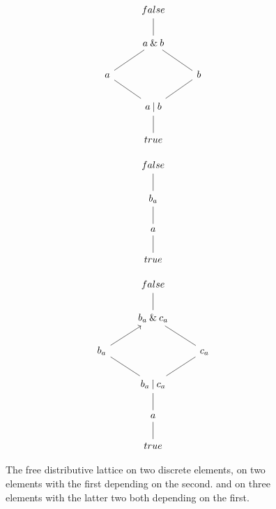 \documentclass[hoptionsi,review,format=acmsmall]{acmart}
\theoremstyle{definition}
\newcommand{\band}{\mathbin{\&}}
\newcommand{\bor}{\mathbin{|}}
\begin{document}
\begin{figure}
\begin{minipage}[c]{0.3\textwidth}
\begin{equation*}
\begin{tikzcd}
             & false                            &              \\
             & a \band b \arrow[u, no head]              &              \\
a \arrow[ru, no head] &                                 & b \arrow[lu, no head] \\
             & a \bor b \arrow[lu, no head] \arrow[ru, no head] &              \\
             & true \arrow[u, no head]                 &             
\end{tikzcd}
\end{equation*}
\end{minipage}
\begin{minipage}[c]{0.3\textwidth}
\begin{equation*}
\begin{tikzcd}
false                    \\
b_{a} \arrow[u, no head] \\
a \arrow[u, no head]     \\
true \arrow[u, no head] 
\end{tikzcd}
\end{equation*}
\end{minipage}
\begin{minipage}[c]{0.3\textwidth}
\begin{equation*}
\begin{tikzcd}
               & false                                                &                         \\
               & b_a \band c_a \arrow[u, no head]                     &                         \\
b_a \arrow[ru] &                                                      & c_a \arrow[lu, no head] \\
               & b_a \bor c_a \arrow[lu, no head] \arrow[ru, no head] &                         \\
               & a \arrow[u, no head]                                 &                         \\
               & true \arrow[u, no head]                              &                        
\end{tikzcd}
\end{equation*}
\end{minipage}
\caption{The free distributive lattice on two discrete elements,  on two elements with the first depending on the second. and on three elements with the latter two both depending on the first.}
\label{Fig5}
\end{figure}
\end{document}
